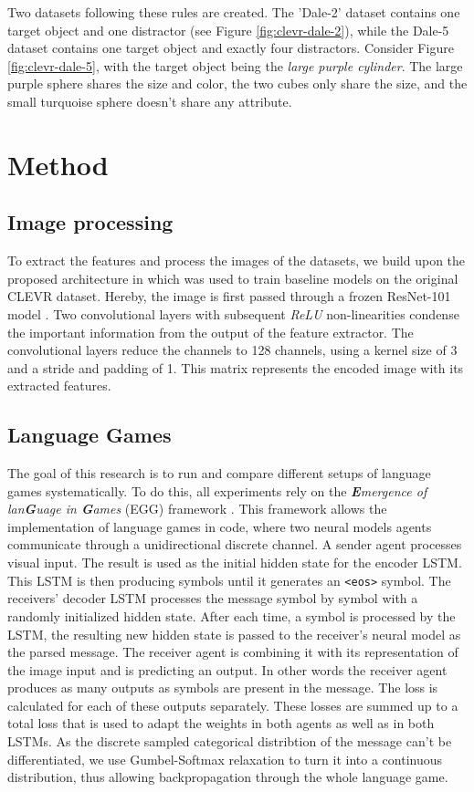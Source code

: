 \documentclass[11pt,a4paper]{article}
\begin{document}
Two datasets following these rules are created.
The 'Dale-2' dataset contains one target object and one distractor (see Figure \ref{fig:clevr-dale-2}), while the Dale-5 dataset contains one target object and exactly four distractors.
Consider Figure \ref{fig:clevr-dale-5}, with the target object being the \emph{large purple cylinder}. The large purple sphere shares the size and color, the two cubes only share the size, and the small turquoise sphere doesn't share any attribute.

\section{Method}
\subsection{Image processing}
\label{sec:image-processing}
To extract the features and process the images of the datasets, we build upon the proposed architecture in \citet{Johnson2017} which was used to train baseline models on the original CLEVR dataset.
Hereby, the image is first passed through a frozen ResNet-101 model \citep{He2016}.
Two convolutional layers with subsequent \emph{ReLU} non-linearities condense the important information from the output of the feature extractor.
The convolutional layers reduce the channels to 128 channels, using a kernel size of 3 and a stride and padding of 1.
This matrix represents the encoded image with its extracted features.

\subsection{Language Games}
\label{sec:methodology:language-games}
The goal of this research is to run and compare different setups of language games systematically.
To do this, all experiments rely on the \emph{\textbf{E}mergence of lan\textbf{G}uage in \textbf{G}ames} (EGG) framework \citep{Kharitonov2019}.
This framework allows the implementation of language games in code, where two neural models agents communicate through a unidirectional discrete channel.
A sender agent processes visual input.
The result is used as the initial hidden state for the encoder LSTM.
This LSTM is then producing symbols until it generates an \texttt{<eos>} symbol.
The receivers' decoder LSTM processes the message symbol by symbol with a randomly initialized hidden state.
After each time, a symbol is processed by the LSTM, the resulting new hidden state is passed to the receiver's neural model as the parsed message.
The receiver agent is combining it with its representation of the image input and is predicting an output.
In other words the receiver agent produces as many outputs as symbols are present in the message.
The loss is calculated for each of these outputs separately.
These losses are summed up to a total loss that is used to adapt the weights in both agents as well as in both LSTMs.
As the discrete sampled categorical distribtion of the message can't be differentiated, we use Gumbel-Softmax relaxation \citep{Jang2017} to turn it into a continuous distribution, thus allowing backpropagation through the whole language game.
\end{document}
